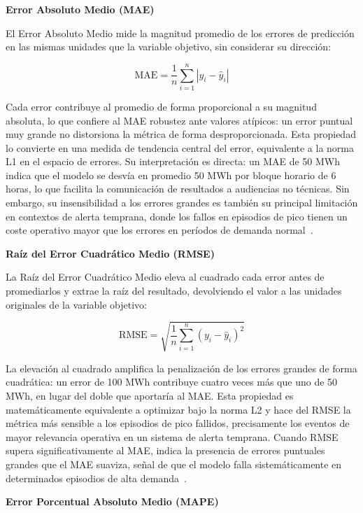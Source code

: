 \documentclass[12pt, a4paper]{article}
\begin{document}
\textbf{Error Absoluto Medio (MAE)}

El Error Absoluto Medio mide la magnitud promedio de los errores de predicción en las mismas unidades que la variable objetivo, sin considerar su dirección:

\begin{equation}
\text{MAE} = \frac{1}{n} \sum_{i=1}^{n} |y_i - \hat{y}_i|
\end{equation}

Cada error contribuye al promedio de forma proporcional a su magnitud absoluta, lo que confiere al MAE robustez ante valores atípicos: un error puntual muy grande no distorsiona la métrica de forma desproporcionada. Esta propiedad lo convierte en una medida de tendencia central del error, equivalente a la norma L1 en el espacio de errores. Su interpretación es directa: un MAE de 50 MWh indica que el modelo se desvía en promedio 50 MWh por bloque horario de 6 horas, lo que facilita la comunicación de resultados a audiencias no técnicas. Sin embargo, su insensibilidad a los errores grandes es también su principal limitación en contextos de alerta temprana, donde los fallos en episodios de pico tienen un coste operativo mayor que los errores en períodos de demanda normal~\cite{gassar2024, rubattu2023}.

\textbf{Raíz del Error Cuadrático Medio (RMSE)}

La Raíz del Error Cuadrático Medio eleva al cuadrado cada error antes de promediarlos y extrae la raíz del resultado, devolviendo el valor a las unidades originales de la variable objetivo:

\begin{equation}
\text{RMSE} = \sqrt{\frac{1}{n} \sum_{i=1}^{n} (y_i - \hat{y}_i)^2}
\end{equation}

La elevación al cuadrado amplifica la penalización de los errores grandes de forma cuadrática: un error de 100 MWh contribuye cuatro veces más que uno de 50 MWh, en lugar del doble que aportaría al MAE. Esta propiedad es matemáticamente equivalente a optimizar bajo la norma L2 y hace del RMSE la métrica más sensible a los episodios de pico fallidos, precisamente los eventos de mayor relevancia operativa en un sistema de alerta temprana. Cuando RMSE supera significativamente al MAE, indica la presencia de errores puntuales grandes que el MAE suaviza, señal de que el modelo falla sistemáticamente en determinados episodios de alta demanda~\cite{gassar2024, rubattu2023}.

\textbf{Error Porcentual Absoluto Medio (MAPE)}
\end{document}
